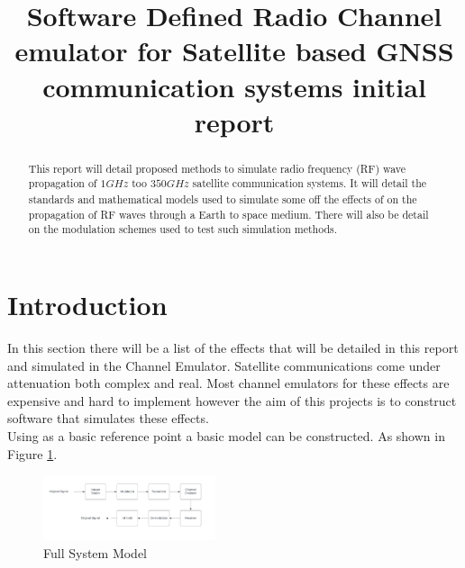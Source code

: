 \documentclass[conference]{IEEEtran}
\begin{document}
\title{Software Defined Radio Channel emulator for Satellite based GNSS communication systems initial report}

\author{
}

\maketitle

\begin{abstract}
This report will detail proposed methods to simulate radio frequency (RF) wave propagation of \textbf{$1G Hz$} too \textbf{$350G Hz$} satellite communication systems. It will detail the standards and mathematical models used to simulate some off the effects of on the propagation of RF waves through a Earth to space medium. There will also be detail on the modulation schemes used to test such simulation methods.
\end{abstract}

\section{Introduction}
In this section there will be a list of the effects that will be detailed in this report and simulated in the Channel Emulator. Satellite communications come under attenuation both complex and real. Most channel emulators for these effects are expensive and hard to implement however the aim of this projects is to construct software that simulates these effects.\\

Using \cite{seybold_introduction_2005} as a basic reference point a basic model can be constructed. As shown in Figure \ref{fig:System_model}. 
\begin{figure}[h]
\centering
	\includegraphics[width = 0.45\textwidth]{System_model.png}
	\caption{Full System Model}
	\label{fig:System_model}
\end{figure}
\end{document}
